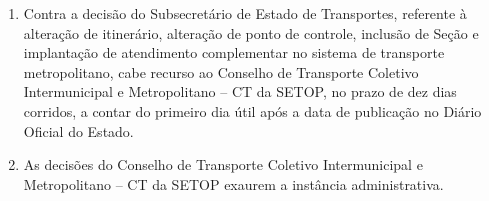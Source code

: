 \begin{enumerate}[resume, label=Art. \arabic*]
\item Contra a decisão do Subsecretário de Estado de Transportes, referente à alteração de itinerário, alteração de ponto de controle, inclusão de Seção e implantação de atendimento complementar no sistema de transporte metropolitano, cabe recurso ao Conselho de Transporte Coletivo Intermunicipal e Metropolitano – CT da SETOP, no prazo de dez dias corridos, a contar do primeiro dia útil após a data de publicação no Diário Oficial do Estado.

\item As decisões do Conselho de Transporte Coletivo Intermunicipal e Metropolitano – CT da SETOP exaurem a instância administrativa.

\end{enumerate}